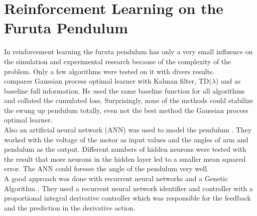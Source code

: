 \section{Reinforcement Learning on the Furuta Pendulum}
In reinforcement learning the furuta pendulum has only a very small influence 
on the simulation and experimental research because of the complexity of the 
problem. Only a few algorithms were tested on it with divers results.\\
\citeauthor{hennig2011optimal} compares Gaussian process optimal learner with 
Kalman filter, TD($\lambda$) and as baseline full information. He used the same 
baseline function for all algorithms and collated the cumulated loss. 
Surprisingly, none of the methods could stabilize the swung up pendulum 
totally, even not the best method the Gaussian process optimal learner.\\
Also an artificial neural network (ANN) was used to model the pendulum 
\cite{quyen2012rotary}. They worked with the voltage of the motor as input 
values and the angles of arm and pendulum as the output. Different numbers of 
hidden neurons were tested with the result that more neurons in the hidden 
layer led to a smaller mean squared error. The ANN could foresee the angle of 
the pendulum very well.\\
A good approach was done with recurrent neural networks and a Genetic Algorithm 
\cite{shojaei2011hybrid}. They used a recurrent neural network identifier and 
controller with a proportional integral derivative controller which was 
responsible for the feedback and the prediction in the derivative action.






